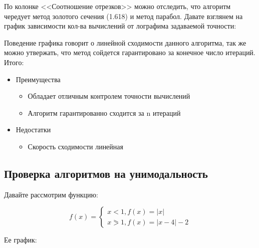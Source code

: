 \documentclass[a4paper, 14pt]{article}
\begin{document}
	По колонке <<Соотношение отрезков>> можно отследить, что алгоритм чередует метод золотого сечения (1.618) и метод парабол. Давате взглянем на график зависимости кол-ва вычислений от лографима задаваемой точности: 
	
	
	Поведение графика говорит о линейной сходимости данного алгоритма, так же можно утвержать, что метод сойдется гарантировано за конечное число итераций.\\
	Итого: 
	
	\begin{itemize}
		\item Преимущества
			\begin{itemize}
				\item Обладает отличным контролем точности вычислений 
				\item Алгоритм гарантированно сходится за n итераций 
 			\end{itemize}
		\item Недостатки
			\begin{itemize}
			\item Скорость сходимости линейная
			\end{itemize}
	\end{itemize}
	
	\subsection*{Проверка алгоритмов на унимодальность}
	Давайте рассмотрим функцию:
	
	\begin{equation*}
		f(x) =
		\begin{cases}
			x < 1, f(x) = |x|\\
			x \eqslantgtr 1, f(x) = |x - 4| - 2
		\end{cases}
	\end{equation*}

	Ее график:
	\\

  
\end{document}
